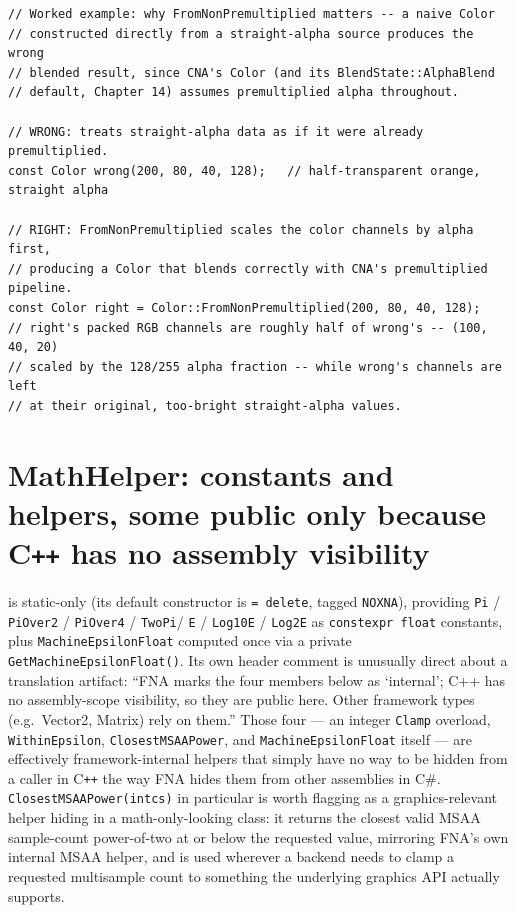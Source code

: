 \begin{lstlisting}
// Worked example: why FromNonPremultiplied matters -- a naive Color
// constructed directly from a straight-alpha source produces the wrong
// blended result, since CNA's Color (and its BlendState::AlphaBlend
// default, Chapter 14) assumes premultiplied alpha throughout.

// WRONG: treats straight-alpha data as if it were already premultiplied.
const Color wrong(200, 80, 40, 128);   // half-transparent orange, straight alpha

// RIGHT: FromNonPremultiplied scales the color channels by alpha first,
// producing a Color that blends correctly with CNA's premultiplied pipeline.
const Color right = Color::FromNonPremultiplied(200, 80, 40, 128);
// right's packed RGB channels are roughly half of wrong's -- (100, 40, 20)
// scaled by the 128/255 alpha fraction -- while wrong's channels are left
// at their original, too-bright straight-alpha values.
\end{lstlisting}

\section{MathHelper: constants and helpers, some public only because C\texttt{++} has no assembly visibility}

 is static-only (its default constructor is \texttt{= delete}, tagged
\texttt{NOXNA}), providing \texttt{Pi} / \texttt{PiOver2} / \texttt{PiOver4} / \texttt{TwoPi}/%
\texttt{E} / \texttt{Log10E} / \texttt{Log2E} as \texttt{constexpr float} constants, plus
\texttt{MachineEpsilonFloat} computed once via a private \texttt{GetMachineEpsilonFloat()}.
Its own header comment is unusually direct about a translation artifact: ``FNA marks the
four members below as `internal'; C++ has no assembly-scope visibility, so they are public
here. Other framework types (e.g.\ Vector2, Matrix) rely on them.'' Those four --- an integer
\texttt{Clamp} overload, \texttt{WithinEpsilon}, \texttt{ClosestMSAAPower}, and
\texttt{MachineEpsilonFloat} itself --- are effectively framework-internal helpers that
simply have no way to be hidden from a caller in C\texttt{++} the way FNA hides them from
other assemblies in C\#. \texttt{ClosestMSAAPower(intcs)} in particular is worth flagging as
a graphics-relevant helper hiding in a math-only-looking class: it returns the closest valid
MSAA sample-count power-of-two at or below the requested value, mirroring FNA's own internal
MSAA helper, and is used wherever a backend needs to clamp a requested multisample count to
something the underlying graphics API actually supports.

